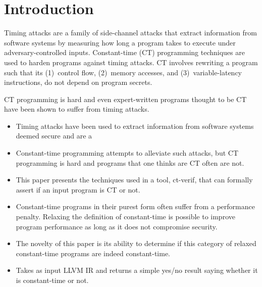 \section{Introduction}

Timing attacks are a family of side-channel attacks that extract information from software systems by measuring how long a program takes to execute under adversary-controlled inputs.
Constant-time (CT) programming techniques are used to harden programs against timing attacks.
CT involves rewriting a program such that its (1)~control flow, (2)~memory accesses, and (3)~variable-latency instructions, do not depend on program secrets.

CT programming is hard and even expert-written programs thought to be CT have been shown to suffer from timing attacks.

\begin{itemize}
  \item Timing attacks have been used to extract information from software systems deemed secure and are a
  \item Constant-time programming attempts to alleviate such attacks, but CT programming is hard and programs that one thinks are CT often are not.
  \item This paper presents the techniques used in a tool, ct-verif, that can formally assert if an input program is CT or not.
  \item Constant-time programs in their purest form often suffer from a performance penalty. Relaxing the definition of constant-time is possible to improve program performance as long as it does not compromise security.
  \item The novelty of this paper is its ability to determine if this category of relaxed constant-time programs are indeed constant-time.
  \item Takes as input LLVM IR and returns a simple yes/no result saying whether it is constant-time or not.
\end{itemize}
